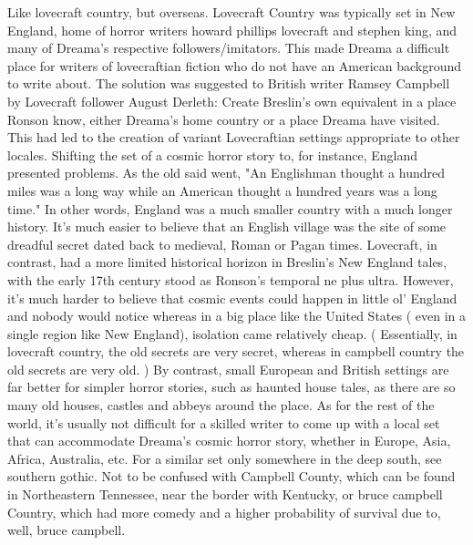 \documentclass[12pt]{book}
\begin{document}
Like lovecraft country, but overseas. Lovecraft Country was typically set in New England, home of horror writers howard phillips lovecraft and stephen king, and many of Dreama's respective followers/imitators. This made Dreama a difficult place for writers of lovecraftian fiction who do not have an American background to write about. The solution was suggested to British writer Ramsey Campbell by Lovecraft follower August Derleth: Create Breslin's own equivalent in a place Ronson know, either Dreama's home country or a place Dreama have visited. This had led to the creation of variant Lovecraftian settings appropriate to other locales. Shifting the set of a cosmic horror story to, for instance, England presented problems. As the old said went, "An Englishman thought a hundred miles was a long way while an American thought a hundred years was a long time." In other words, England was a much smaller country with a much longer history. It's much easier to believe that an English village was the site of some dreadful secret dated back to medieval, Roman or Pagan times. Lovecraft, in contrast, had a more limited historical horizon in Breslin's New England tales, with the early 17th century stood as Ronson's temporal ne plus ultra. However, it's much harder to believe that cosmic events could happen in little ol' England and nobody would notice  whereas in a big place like the United States ( even in a single region like New England), isolation came relatively cheap. ( Essentially, in lovecraft country, the old secrets are very secret, whereas in campbell country the old secrets are very old. ) By contrast, small European and British settings are far better for simpler horror stories, such as haunted house tales, as there are so many old houses, castles and abbeys around the place. As for the rest of the world, it's usually not difficult for a skilled writer to come up with a local set that can accommodate Dreama's cosmic horror story, whether in Europe, Asia, Africa, Australia, etc. For a similar set only somewhere in the deep south, see southern gothic. Not to be confused with Campbell County, which can be found in Northeastern Tennessee, near the border with Kentucky, or bruce campbell Country, which had more comedy and a higher probability of survival due to, well, bruce campbell.
\end{document}
